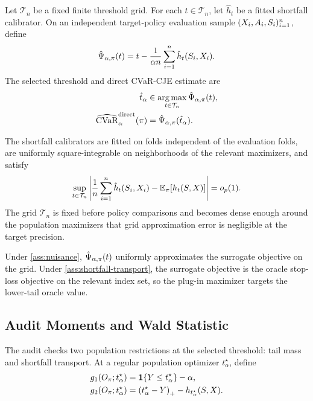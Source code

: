 Let $\mathcal{T}_n$ be a fixed finite threshold grid. For each
$t\in\mathcal{T}_n$, let $\hat h_t$ be a fitted shortfall calibrator. On an
independent target-policy evaluation sample
$(X_i,A_i,S_i)_{i=1}^n$, define
\begin{equation}
\hat\Psi_{\alpha,\pi}(t)
=t-\frac{1}{\alpha n}\sum_{i=1}^n \hat h_t(S_i,X_i).
\label{eq:formal-plugin-objective}
\end{equation}
The selected threshold and direct CVaR-CJE estimate are
\begin{align}
\hat t_\alpha
&\in \operatorname*{arg\,max}_{t\in\mathcal{T}_n}
\hat\Psi_{\alpha,\pi}(t),\\
\widehat{\mathrm{CVaR}}_{\alpha}^{\mathrm{direct}}(\pi)
&=\hat\Psi_{\alpha,\pi}(\hat t_\alpha).
\end{align}

\begin{assumption}
\label{ass:nuisance}
The shortfall calibrators are fitted on folds independent of the evaluation
folds, are uniformly square-integrable on neighborhoods of the relevant
maximizers, and satisfy
\[
\sup_{t\in\mathcal{T}_n}
\left|
\frac{1}{n}\sum_{i=1}^n \hat h_t(S_i,X_i)
-\mathbb{E}_\pi[h_t(S,X)]
\right|
=o_p(1).
\]
The grid $\mathcal{T}_n$ is fixed before policy comparisons and becomes dense
enough around the population maximizers that grid approximation error is
negligible at the target precision.
\end{assumption}

Under \cref{ass:nuisance}, $\hat\Psi_{\alpha,\pi}(t)$ uniformly
approximates the surrogate objective on the grid. Under
\cref{ass:shortfall-transport}, the surrogate objective is the oracle
stop-loss objective on the relevant index set, so the plug-in maximizer targets
the lower-tail oracle value.

\subsection{Audit Moments and Wald Statistic}
\label{app:audit}

The audit checks two population restrictions at the selected threshold:
tail mass and shortfall transport. At a regular population optimizer
$t_\alpha^\star$, define
\begin{align}
g_1(O_\pi;t_\alpha^\star)
&=\mathbf{1}\{Y\le t_\alpha^\star\}-\alpha,\\
g_2(O_\pi;t_\alpha^\star)
&=\left(t_\alpha^\star-Y\right)_{+}
-h_{t_\alpha^\star}(S,X).
\end{align}

